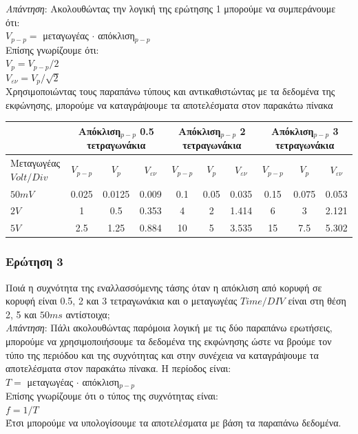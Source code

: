 \documentclass{article}
\begin{document}
\textit{Απάντηση}: Ακολουθώντας την λογική της ερώτησης 1 μπορούμε
να συμπεράνουμε ότι: \\
$V_{p-p} =$ μεταγωγέας $\cdot$ απόκλιση$_{p-p}$ \\
Επίσης γνωρίζουμε ότι: \\
$V_p = V_{p-p} / 2$ \\
$V_{εν} = V_p / \sqrt 2$ \\
Χρησιμοποιώντας τους παραπάνω τύπους και αντικαθιστώντας με τα δεδομένα
της εκφώνησης, μπορούμε να καταγράψουμε τα αποτελέσματα στον παρακάτω
πίνακα

\begin{center}
\begin{tabular}{|p{20mm}|c|c|c|c|c|c|c|c|c|}
        \hline
        &
        \multicolumn{3}{p{27mm}|}{Απόκλιση$_{p-p}$ 0.5 τετραγωνάκια} &
        \multicolumn{3}{p{27mm}|}{Απόκλιση$_{p-p}$ 2 τετραγωνάκια} &
        \multicolumn{3}{p{27mm}|}{Απόκλιση$_{p-p}$ 3 τετραγωνάκια} \\
        \hline
        Μεταγωγέας $Volt / Div$ & $V_{p-p}$ & $V_p$ & $V_{εν}$ &
        $V_{p-p}$ & $V_p$ & $V_{εν}$ &
        $V_{p-p}$ & $V_p$ & $V_{εν}$ \\
        \hline
        $50mV$ & 0.025 & 0.0125 & 0.009 & 0.1 & 0.05 & 0.035 & 0.15 & 0.075 & 0.053 \\
        \hline
        $2V$ & 1 & 0.5 & 0.353 & 4 & 2 & 1.414 & 6 & 3 & 2.121 \\
        \hline
        $5V$ & 2.5 & 1.25 & 0.884 & 10 & 5 & 3.535 & 15 & 7.5 & 5.302 \\
        \hline
\end{tabular}
\end{center}

\subsubsection{Ερώτηση 3}
Ποιά η συχνότητα της εναλλασσόμενης τάσης όταν η απόκλιση από κορυφή
σε κορυφή είναι 0.5, 2 και 3 τετραγωνάκια και ο μεταγωγέας $Time / DIV$ είναι στη
θέση 2, 5 και $50ms$ αντίστοιχα; \\

\textit{Απάντηση}: Πάλι ακολουθώντας παρόμοια λογική με τις δύο παραπάνω ερωτήσεις,
μπορούμε να χρησιμοποιήσουμε τα δεδομένα της εκφώνησης ώστε να βρούμε τον τύπο της
περιόδου και της συχνότητας και στην συνέχεια να καταγράψουμε τα αποτελέσματα 
στον παρακάτω πίνακα. Η περίοδος είναι: \\
$T =$ μεταγωγέας $\cdot$ απόκλιση$_{p-p}$ \\
Επίσης γνωρίζουμε ότι ο τύπος της συχνότητας είναι: \\
$f = 1 / T$ \\
Έτσι μπορούμε να υπολογίσουμε τα αποτελέσματα με βάση τα παραπάνω δεδομένα.
\end{document}
